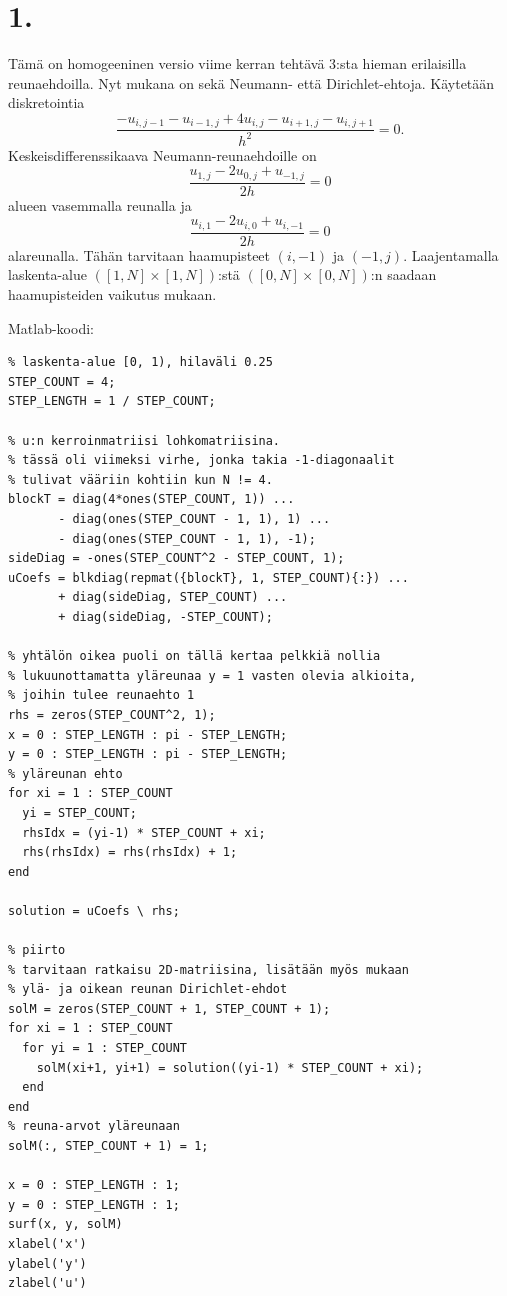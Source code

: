 \documentclass{article}
\title{}
\author{Mikael Myyrä}
\date{}
\begin{document}
\section*{1.}

Tämä on homogeeninen versio viime kerran tehtävä 3:sta hieman erilaisilla
reunaehdoilla. Nyt mukana on sekä Neumann- että Dirichlet-ehtoja.
Käytetään diskretointia
\[
  \frac{-u_{i,j-1} - u_{i-1,j} + 4u_{i,j} - u_{i+1,j} - u_{i,j+1}}{h^2} = 0.
\]
Keskeisdifferenssikaava Neumann-reunaehdoille on
\[
  \frac{u_{1,j} - 2u_{0,j} + u_{-1,j}}{2h} = 0
\]
alueen vasemmalla reunalla ja
\[
  \frac{u_{i,1} - 2u_{i,0} + u_{i,-1}}{2h} = 0
\]
alareunalla. Tähän tarvitaan haamupisteet $(i,-1)$ ja $(-1,j)$.
Laajentamalla laskenta-alue $([1, N] \times [1, N])$:stä
$([0, N] \times [0, N])$:n saadaan haamupisteiden vaikutus mukaan.

Matlab-koodi:

\begin{verbatim}
% laskenta-alue [0, 1), hilaväli 0.25
STEP_COUNT = 4;
STEP_LENGTH = 1 / STEP_COUNT;

% u:n kerroinmatriisi lohkomatriisina.
% tässä oli viimeksi virhe, jonka takia -1-diagonaalit
% tulivat vääriin kohtiin kun N != 4.
blockT = diag(4*ones(STEP_COUNT, 1)) ...
       - diag(ones(STEP_COUNT - 1, 1), 1) ...
       - diag(ones(STEP_COUNT - 1, 1), -1);
sideDiag = -ones(STEP_COUNT^2 - STEP_COUNT, 1);
uCoefs = blkdiag(repmat({blockT}, 1, STEP_COUNT){:}) ...
       + diag(sideDiag, STEP_COUNT) ...
       + diag(sideDiag, -STEP_COUNT);

% yhtälön oikea puoli on tällä kertaa pelkkiä nollia
% lukuunottamatta yläreunaa y = 1 vasten olevia alkioita,
% joihin tulee reunaehto 1
rhs = zeros(STEP_COUNT^2, 1);
x = 0 : STEP_LENGTH : pi - STEP_LENGTH;
y = 0 : STEP_LENGTH : pi - STEP_LENGTH;
% yläreunan ehto
for xi = 1 : STEP_COUNT
  yi = STEP_COUNT;
  rhsIdx = (yi-1) * STEP_COUNT + xi;
  rhs(rhsIdx) = rhs(rhsIdx) + 1;
end

solution = uCoefs \ rhs;

% piirto
% tarvitaan ratkaisu 2D-matriisina, lisätään myös mukaan
% ylä- ja oikean reunan Dirichlet-ehdot
solM = zeros(STEP_COUNT + 1, STEP_COUNT + 1);
for xi = 1 : STEP_COUNT
  for yi = 1 : STEP_COUNT
    solM(xi+1, yi+1) = solution((yi-1) * STEP_COUNT + xi);
  end
end
% reuna-arvot yläreunaan
solM(:, STEP_COUNT + 1) = 1;

x = 0 : STEP_LENGTH : 1;
y = 0 : STEP_LENGTH : 1;
surf(x, y, solM)
xlabel('x')
ylabel('y')
zlabel('u')
\end{verbatim}
\end{document}

